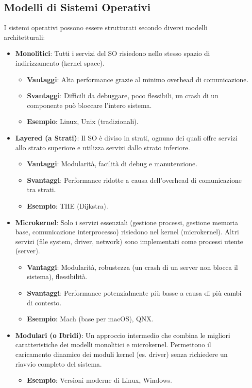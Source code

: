 \subsection{Modelli di Sistemi Operativi}
I sistemi operativi possono essere strutturati secondo diversi modelli architetturali:
\begin{itemize}
    \item \textbf{Monolitici}: Tutti i servizi del SO risiedono nello stesso spazio di indirizzamento (kernel space).
    \begin{itemize}
        \item \textbf{Vantaggi}: Alta performance grazie al minimo overhead di comunicazione.
        \item \textbf{Svantaggi}: Difficili da debuggare, poco flessibili, un crash di un componente può bloccare l'intero sistema.
        \item \textbf{Esempio}: Linux, Unix (tradizionali).
    \end{itemize}
    \item \textbf{Layered (a Strati)}: Il SO è diviso in strati, ognuno dei quali offre servizi allo strato superiore e utilizza servizi dallo strato inferiore.
    \begin{itemize}
        \item \textbf{Vantaggi}: Modularità, facilità di debug e manutenzione.
        \item \textbf{Svantaggi}: Performance ridotte a causa dell'overhead di comunicazione tra strati.
        \item \textbf{Esempio}: THE (Dijkstra).
    \end{itemize}
    \item \textbf{Microkernel}: Solo i servizi essenziali (gestione processi, gestione memoria base, comunicazione interprocesso) risiedono nel kernel (microkernel). Altri servizi (file system, driver, network) sono implementati come processi utente (server).
    \begin{itemize}
        \item \textbf{Vantaggi}: Modularità, robustezza (un crash di un server non blocca il sistema), flessibilità.
        \item \textbf{Svantaggi}: Performance potenzialmente più basse a causa di più cambi di contesto.
        \item \textbf{Esempio}: Mach (base per macOS), QNX.
    \end{itemize}
    \item \textbf{Modulari (o Ibridi)}: Un approccio intermedio che combina le migliori caratteristiche dei modelli monolitici e microkernel. Permettono il caricamento dinamico dei moduli kernel (es. driver) senza richiedere un riavvio completo del sistema.
    \begin{itemize}
        \item \textbf{Esempio}: Versioni moderne di Linux, Windows.
    \end{itemize}
\end{itemize}

